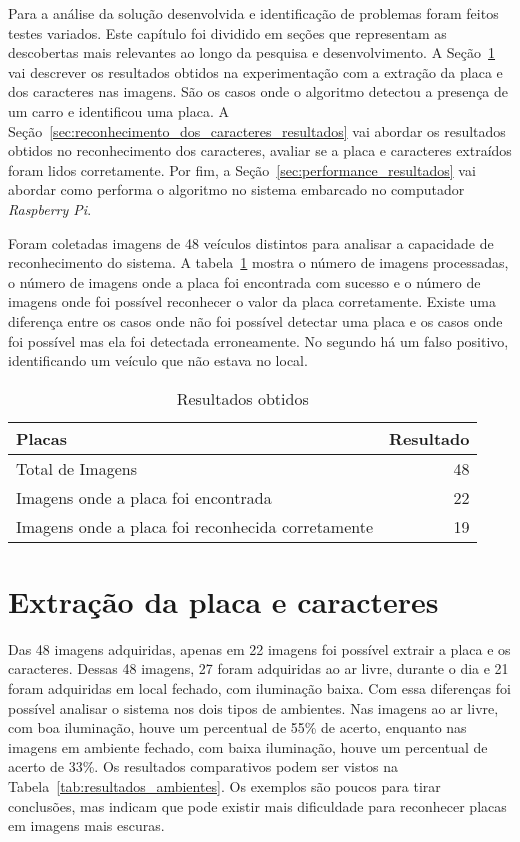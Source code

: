 Para a análise da solução desenvolvida e identificação de problemas foram feitos
testes variados. Este capítulo foi dividido em seções que representam as
descobertas mais relevantes ao longo da pesquisa e desenvolvimento. A
Seção~\ref{sec:extracao_da_placa_resultados} vai descrever os resultados obtidos
na experimentação com a extração da placa e dos caracteres nas imagens. São os casos
onde o algoritmo detectou a presença de um carro e identificou uma placa. A
Seção~\ref{sec:reconhecimento_dos_caracteres_resultados} vai abordar os
resultados obtidos no reconhecimento dos caracteres, avaliar se a placa e caracteres
extraídos foram lidos corretamente. Por fim, a
Seção~\ref{sec:performance_resultados} vai abordar como performa o algoritmo no
sistema embarcado no computador \emph{Raspberry Pi}.

Foram coletadas imagens de 48 veículos distintos para analisar a capacidade de
reconhecimento do sistema. A tabela~\ref{tab:resultados} mostra o número de
imagens processadas, o número de imagens onde a placa foi encontrada com sucesso
e o número de imagens onde foi possível reconhecer o valor da placa corretamente.
Existe uma diferença entre os casos onde não foi possível detectar uma placa e os
casos onde foi possível mas ela foi detectada erroneamente. No segundo há um falso
positivo, identificando um veículo que não estava no local.

\begin{table}[]
\centering
\caption{Resultados obtidos}
\label{tab:resultados}
\begin{tabular}{@{}lr@{}}
\toprule
Placas                               & \multicolumn{1}{l}{Resultado} \\ \midrule
Total de Imagens                     & 48                           \\
Imagens onde a placa foi encontrada  & 22                            \\
Imagens onde a placa foi reconhecida corretamente & 19
\end{tabular}
\end{table}

\section{Extração da placa e caracteres}
\label{sec:extracao_da_placa_resultados}

Das 48 imagens adquiridas, apenas em 22 imagens foi possível extrair a placa e
os caracteres. Dessas 48 imagens, 27 foram adquiridas ao ar livre, durante o dia
e 21 foram adquiridas em local fechado, com iluminação baixa. Com essa
diferenças foi possível analisar o sistema nos dois tipos de ambientes. Nas
imagens ao ar livre, com boa iluminação, houve um percentual de 55\% de acerto,
enquanto nas imagens em ambiente fechado, com baixa iluminação, houve um
percentual de acerto de 33\%. Os resultados comparativos podem ser vistos na
Tabela~\ref{tab:resultados_ambientes}. Os exemplos são poucos para tirar
conclusões, mas indicam que pode existir mais dificuldade para reconhecer placas
em imagens mais escuras.

